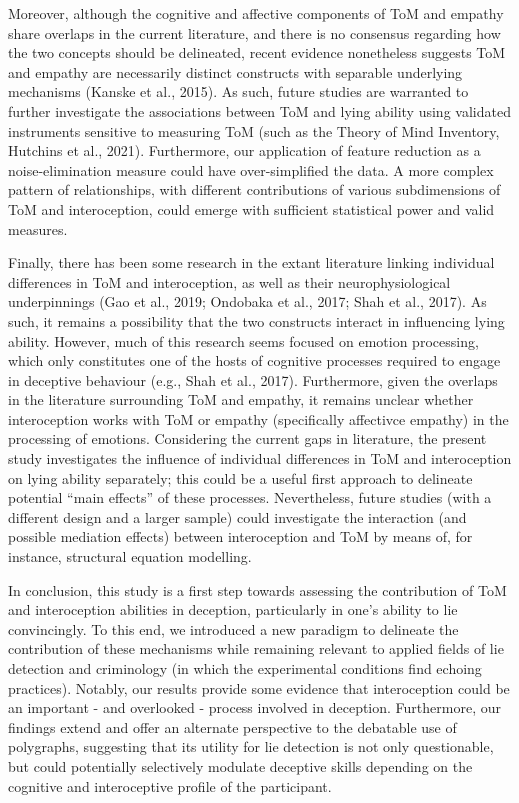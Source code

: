 \documentclass[
  man,mask,floatsintext]{apa6}
\begin{document}
Moreover, although the cognitive and affective components of ToM and empathy share overlaps in the current literature, and there is no consensus regarding how the two concepts should be delineated, recent evidence nonetheless suggests ToM and empathy are necessarily distinct constructs with separable underlying mechanisms (Kanske et al., 2015). As such, future studies are warranted to further investigate the associations between ToM and lying ability using validated instruments sensitive to measuring ToM (such as the Theory of Mind Inventory, Hutchins et al., 2021). Furthermore, our application of feature reduction as a noise-elimination measure could have over-simplified the data. A more complex pattern of relationships, with different contributions of various subdimensions of ToM and interoception, could emerge with sufficient statistical power and valid measures.

Finally, there has been some research in the extant literature linking individual differences in ToM and interoception, as well as their neurophysiological underpinnings (Gao et al., 2019; Ondobaka et al., 2017; Shah et al., 2017). As such, it remains a possibility that the two constructs interact in influencing lying ability. However, much of this research seems focused on emotion processing, which only constitutes one of the hosts of cognitive processes required to engage in deceptive behaviour (e.g., Shah et al., 2017). Furthermore, given the overlaps in the literature surrounding ToM and empathy, it remains unclear whether interoception works with ToM or empathy (specifically affectivce empathy) in the processing of emotions. Considering the current gaps in literature, the present study investigates the influence of individual differences in ToM and interoception on lying ability separately; this could be a useful first approach to delineate potential ``main effects'' of these processes. Nevertheless, future studies (with a different design and a larger sample) could investigate the interaction (and possible mediation effects) between interoception and ToM by means of, for instance, structural equation modelling.

In conclusion, this study is a first step towards assessing the contribution of ToM and interoception abilities in deception, particularly in one's ability to lie convincingly. To this end, we introduced a new paradigm to delineate the contribution of these mechanisms while remaining relevant to applied fields of lie detection and criminology (in which the experimental conditions find echoing practices). Notably, our results provide some evidence that interoception could be an important - and overlooked - process involved in deception. Furthermore, our findings extend and offer an alternate perspective to the debatable use of polygraphs, suggesting that its utility for lie detection is not only questionable, but could potentially selectively modulate deceptive skills depending on the cognitive and interoceptive profile of the participant.
\end{document}
